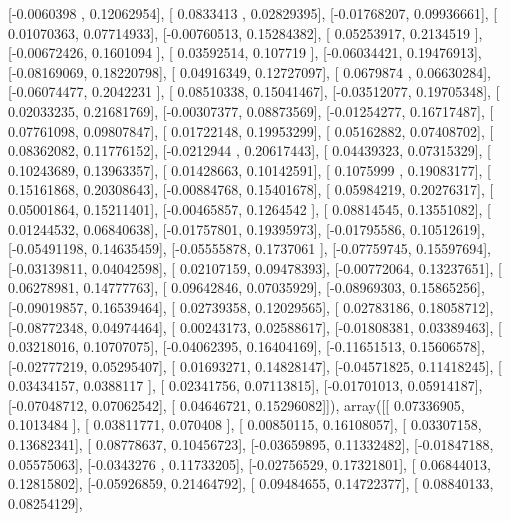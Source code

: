 \documentclass{article}
\begin{document}
       [-0.0060398 ,  0.12062954],
       [ 0.0833413 ,  0.02829395],
       [-0.01768207,  0.09936661],
       [ 0.01070363,  0.07714933],
       [-0.00760513,  0.15284382],
       [ 0.05253917,  0.2134519 ],
       [-0.00672426,  0.1601094 ],
       [ 0.03592514,  0.107719  ],
       [-0.06034421,  0.19476913],
       [-0.08169069,  0.18220798],
       [ 0.04916349,  0.12727097],
       [ 0.0679874 ,  0.06630284],
       [-0.06074477,  0.2042231 ],
       [ 0.08510338,  0.15041467],
       [-0.03512077,  0.19705348],
       [ 0.02033235,  0.21681769],
       [-0.00307377,  0.08873569],
       [-0.01254277,  0.16717487],
       [ 0.07761098,  0.09807847],
       [ 0.01722148,  0.19953299],
       [ 0.05162882,  0.07408702],
       [ 0.08362082,  0.11776152],
       [-0.0212944 ,  0.20617443],
       [ 0.04439323,  0.07315329],
       [ 0.10243689,  0.13963357],
       [ 0.01428663,  0.10142591],
       [ 0.1075999 ,  0.19083177],
       [ 0.15161868,  0.20308643],
       [-0.00884768,  0.15401678],
       [ 0.05984219,  0.20276317],
       [ 0.05001864,  0.15211401],
       [-0.00465857,  0.1264542 ],
       [ 0.08814545,  0.13551082],
       [ 0.01244532,  0.06840638],
       [-0.01757801,  0.19395973],
       [-0.01795586,  0.10512619],
       [-0.05491198,  0.14635459],
       [-0.05555878,  0.1737061 ],
       [-0.07759745,  0.15597694],
       [-0.03139811,  0.04042598],
       [ 0.02107159,  0.09478393],
       [-0.00772064,  0.13237651],
       [ 0.06278981,  0.14777763],
       [ 0.09642846,  0.07035929],
       [-0.08969303,  0.15865256],
       [-0.09019857,  0.16539464],
       [ 0.02739358,  0.12029565],
       [ 0.02783186,  0.18058712],
       [-0.08772348,  0.04974464],
       [ 0.00243173,  0.02588617],
       [-0.01808381,  0.03389463],
       [ 0.03218016,  0.10707075],
       [-0.04062395,  0.16404169],
       [-0.11651513,  0.15606578],
       [-0.02777219,  0.05295407],
       [ 0.01693271,  0.14828147],
       [-0.04571825,  0.11418245],
       [ 0.03434157,  0.0388117 ],
       [ 0.02341756,  0.07113815],
       [-0.01701013,  0.05914187],
       [-0.07048712,  0.07062542],
       [ 0.04646721,  0.15296082]]), array([[ 0.07336905,  0.1013484 ],
       [ 0.03811771,  0.070408  ],
       [ 0.00850115,  0.16108057],
       [ 0.03307158,  0.13682341],
       [ 0.08778637,  0.10456723],
       [-0.03659895,  0.11332482],
       [-0.01847188,  0.05575063],
       [-0.0343276 ,  0.11733205],
       [-0.02756529,  0.17321801],
       [ 0.06844013,  0.12815802],
       [-0.05926859,  0.21464792],
       [ 0.09484655,  0.14722377],
       [ 0.08840133,  0.08254129],
\end{document}
